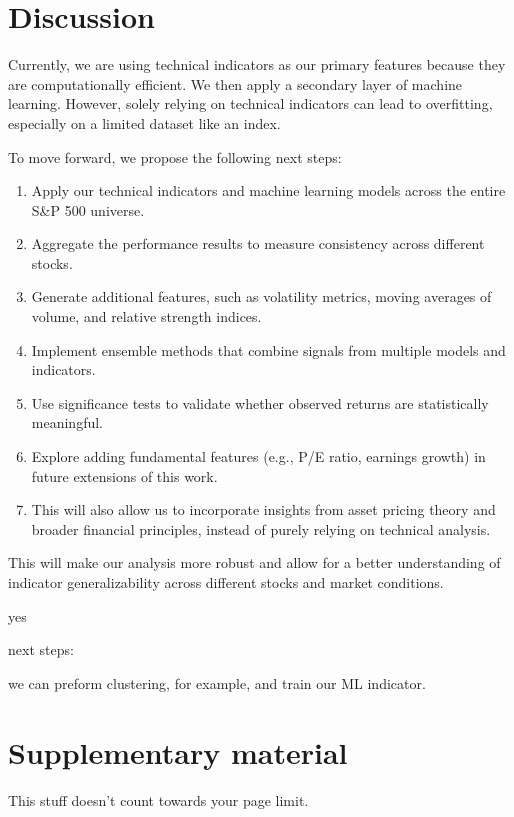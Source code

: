 \documentclass{article}
\begin{document}
\section{Discussion}
Currently, we are using technical indicators as our primary features because they are computationally efficient. We then apply a secondary layer of machine learning. However, solely relying on technical indicators can lead to overfitting, especially on a limited dataset like an index.

To move forward, we propose the following next steps:
\begin{enumerate}
    \item Apply our technical indicators and machine learning models across the entire S\&P 500 universe.
    \item Aggregate the performance results to measure consistency across different stocks.
    \item Generate additional features, such as volatility metrics, moving averages of volume, and relative strength indices.
    \item Implement ensemble methods that combine signals from multiple models and indicators.
    \item Use significance tests to validate whether observed returns are statistically meaningful.
    \item Explore adding fundamental features (e.g., P/E ratio, earnings growth) in future extensions of this work.
    \item This will also allow us to incorporate insights from asset pricing theory and broader financial principles, instead of purely relying on technical analysis.
\end{enumerate}
This will make our analysis more robust and allow for a better understanding of indicator generalizability across different stocks and market conditions.

yes 


next steps:

we can preform clustering, for example, and train our ML indicator.


\printbibliography



\appendix

\section{Supplementary material} \label{app:info}

This stuff doesn't count towards your page limit.
\end{document}
